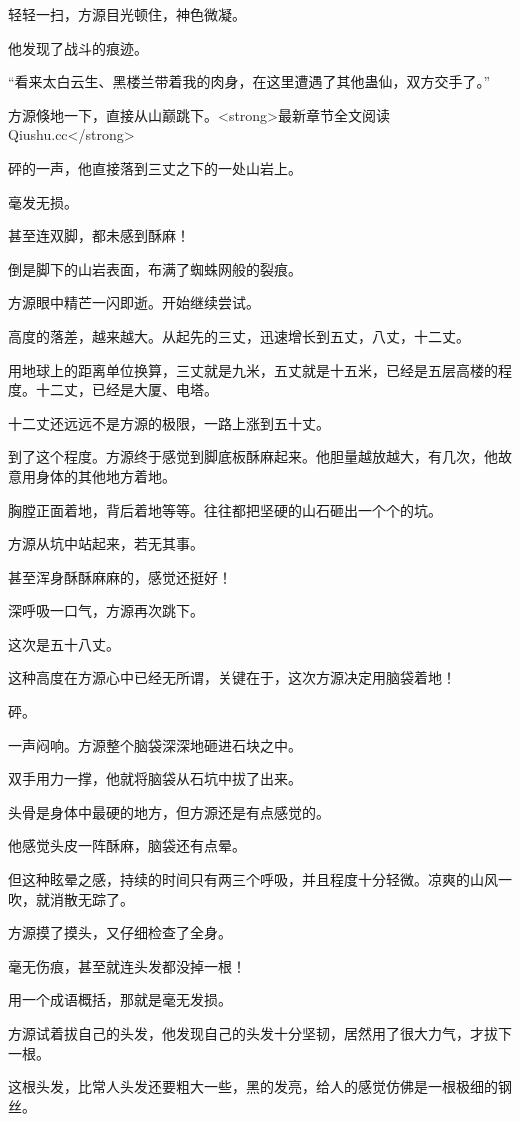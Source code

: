 \begin{this_body}
轻轻一扫，方源目光顿住，神色微凝。

他发现了战斗的痕迹。

“看来太白云生、黑楼兰带着我的肉身，在这里遭遇了其他蛊仙，双方交手了。”

方源倏地一下，直接从山巅跳下。<strong>最新章节全文阅读Qiushu.cc</strong>

砰的一声，他直接落到三丈之下的一处山岩上。

毫发无损。

甚至连双脚，都未感到酥麻！

倒是脚下的山岩表面，布满了蜘蛛网般的裂痕。

方源眼中精芒一闪即逝。开始继续尝试。

高度的落差，越来越大。从起先的三丈，迅速增长到五丈，八丈，十二丈。

用地球上的距离单位换算，三丈就是九米，五丈就是十五米，已经是五层高楼的程度。十二丈，已经是大厦、电塔。

十二丈还远远不是方源的极限，一路上涨到五十丈。

到了这个程度。方源终于感觉到脚底板酥麻起来。他胆量越放越大，有几次，他故意用身体的其他地方着地。

胸膛正面着地，背后着地等等。往往都把坚硬的山石砸出一个个的坑。

方源从坑中站起来，若无其事。

甚至浑身酥酥麻麻的，感觉还挺好！

深呼吸一口气，方源再次跳下。

这次是五十八丈。

这种高度在方源心中已经无所谓，关键在于，这次方源决定用脑袋着地！

砰。

一声闷响。方源整个脑袋深深地砸进石块之中。

双手用力一撑，他就将脑袋从石坑中拔了出来。

头骨是身体中最硬的地方，但方源还是有点感觉的。

他感觉头皮一阵酥麻，脑袋还有点晕。

但这种眩晕之感，持续的时间只有两三个呼吸，并且程度十分轻微。凉爽的山风一吹，就消散无踪了。

方源摸了摸头，又仔细检查了全身。

毫无伤痕，甚至就连头发都没掉一根！

用一个成语概括，那就是毫无发损。

方源试着拔自己的头发，他发现自己的头发十分坚韧，居然用了很大力气，才拔下一根。

这根头发，比常人头发还要粗大一些，黑的发亮，给人的感觉仿佛是一根极细的钢丝。


\end{this_body}
